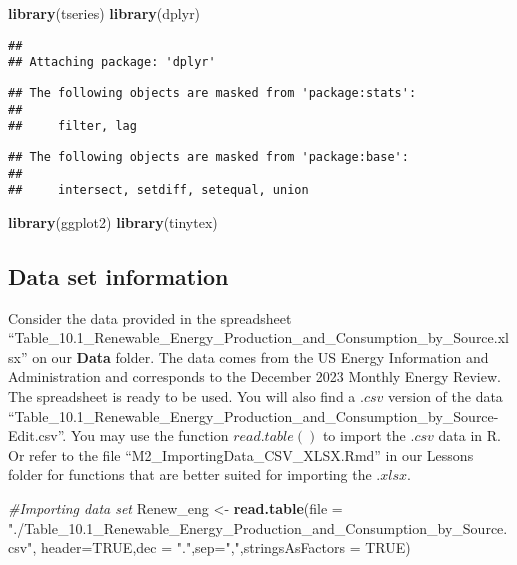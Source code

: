 \documentclass[
]{article}
\newenvironment{Shaded}{\begin{snugshade}}{\end{snugshade}}
\newcommand{\AttributeTok}[1]{\textcolor[rgb]{0.13,0.29,0.53}{#1}}
\newcommand{\CommentTok}[1]{\textcolor[rgb]{0.56,0.35,0.01}{\textit{#1}}}
\newcommand{\ConstantTok}[1]{\textcolor[rgb]{0.56,0.35,0.01}{#1}}
\newcommand{\FunctionTok}[1]{\textcolor[rgb]{0.13,0.29,0.53}{\textbf{#1}}}
\newcommand{\NormalTok}[1]{#1}
\newcommand{\OtherTok}[1]{\textcolor[rgb]{0.56,0.35,0.01}{#1}}
\newcommand{\StringTok}[1]{\textcolor[rgb]{0.31,0.60,0.02}{#1}}
\begin{document}
\begin{Shaded}
\begin{Highlighting}[]
\FunctionTok{library}\NormalTok{(tseries)}
\FunctionTok{library}\NormalTok{(dplyr)}
\end{Highlighting}
\end{Shaded}

\begin{verbatim}
## 
## Attaching package: 'dplyr'
\end{verbatim}

\begin{verbatim}
## The following objects are masked from 'package:stats':
## 
##     filter, lag
\end{verbatim}

\begin{verbatim}
## The following objects are masked from 'package:base':
## 
##     intersect, setdiff, setequal, union
\end{verbatim}

\begin{Shaded}
\begin{Highlighting}[]
\FunctionTok{library}\NormalTok{(ggplot2)}
\FunctionTok{library}\NormalTok{(tinytex)}
\end{Highlighting}
\end{Shaded}

\hypertarget{data-set-information}{%
\subsection{Data set information}\label{data-set-information}}

Consider the data provided in the spreadsheet
``Table\_10.1\_Renewable\_Energy\_Production\_and\_Consumption\_by\_Source.xlsx''
on our \textbf{Data} folder. The data comes from the US Energy
Information and Administration and corresponds to the December 2023
Monthly Energy Review. The spreadsheet is ready to be used. You will
also find a \(.csv\) version of the data
``Table\_10.1\_Renewable\_Energy\_Production\_and\_Consumption\_by\_Source-Edit.csv''.
You may use the function \(read.table()\) to import the \(.csv\) data in
R. Or refer to the file ``M2\_ImportingData\_CSV\_XLSX.Rmd'' in our
Lessons folder for functions that are better suited for importing the
\(.xlsx\).

\begin{Shaded}
\begin{Highlighting}[]
\CommentTok{\#Importing data set}
\NormalTok{Renew\_eng }\OtherTok{\textless{}{-}} \FunctionTok{read.table}\NormalTok{(}\AttributeTok{file =} \StringTok{"./Table\_10.1\_Renewable\_Energy\_Production\_and\_Consumption\_by\_Source.csv"}\NormalTok{, }\AttributeTok{header=}\ConstantTok{TRUE}\NormalTok{,}\AttributeTok{dec =} \StringTok{"."}\NormalTok{,}\AttributeTok{sep=}\StringTok{","}\NormalTok{,}\AttributeTok{stringsAsFactors =} \ConstantTok{TRUE}\NormalTok{)}
\end{Highlighting}
\end{Shaded}
\end{document}
